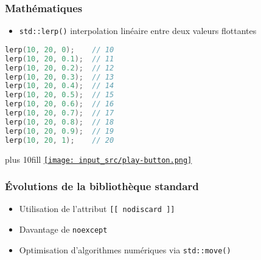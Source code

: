 \documentclass[C++.tex]{subfiles}
\begin{document}
\begin{frame}[fragile]
\frametitle{Mathématiques}
	\begin{itemize}
		\item \lstinline|std::lerp()| interpolation linéaire entre deux valeurs flottantes
	\end{itemize}

	\begin{lstlisting}[language=C++]
lerp(10, 20, 0);    // 10
lerp(10, 20, 0.1);  // 11
lerp(10, 20, 0.2);  // 12
lerp(10, 20, 0.3);  // 13
lerp(10, 20, 0.4);  // 14
lerp(10, 20, 0.5);  // 15
lerp(10, 20, 0.6);  // 16
lerp(10, 20, 0.7);  // 17
lerp(10, 20, 0.8);  // 18
lerp(10, 20, 0.9);  // 19
lerp(10, 20, 1);    // 20\end{lstlisting}

	\vskip 10mm plus 10fill
	\hfill
	\href{https://godbolt.org/#z:OYLghAFBqd5QCxAYwPYBMCmBRdBLAF1QCcAaPECAMzwBtMA7AQwFtMQByARg9KtQYEAysib0QXACx8BBAKoBnTAAUAHpwAMvAFYTStJg1DIApACYAQuYukl9ZATwDKjdAGFUtAK4sGe1wAyeAyYAHI%2BAEaYxBIAHKQADqgKhE4MHt6%2BekkpjgJBIeEsUTFc8XaYDmlCBEzEBBk%2Bfly2mPZ5DDV1BAVhkdF6CrX1jVktQ929RSUSAJS2qF7EyOwc5gDMwcjeWADUJutuTkPEmKwH2CYaAIIbWzuY%2B4fILEwECBdXtzfBBLuvwQgsy%2BJgA7FYbrtdkN0CAUIs/gc3EjoQRYSB6MQEhAuBpSLszHjdhpZk9kYd9mYzCYAKxuBjmanrCHXKEwuFoLyIw4o9kY6LY3H4wn4jQAOi4pKRKMZtPpsuZXzZaI5CLJvJV/KxOKJIuJYrMUp5FNldIZVIOLOV6M53PJblR6Mxgt1RPF6yN9sp1LNCqtjtVXPVFL5zp1wrdYsknplFt9FsVkID8KD0pDmrDQoJkZpMZNcflCf9fNtwYdoYF4ezorFADY8w7TYWmcXNaW0%2BWM5Ws3rxaCG965eaW0rk%2B3jZ2nd3XTXYgOm8PLaOS2qO8nMzP9QBOecFxeJ1lj1cT9fTiP4yVlwfxkc3MEAES%2BHHmtE4NN4fg4WlIqE4yMs1jQosyyPBsPCkAQmjPvMADWIA0nir4cJIH5QT%2BnC8AoIB4pBX7PqQcCwEgmCqJUXIkOQlB1MACjKIYbRCAgqAAO6fuBaAsAkdBvGkdEhLQjEsZ%2B34cVxmIgMAXBUqQol0NEoSsKsvCyZiADyXKCaxaEkZU1zEDRGGkDpyA1Pgn68PwggiGI7BSDIgiKCo6h4aQugtAYRgoNY1j6HgERYbAzBsCAESoMkBCkAAbgM3Cgu%2BszzKgCQdFhHAALQwgc96mABliErsaUAOpiLQBWFSRBDEEwBUJJg6CGI4yCYcBKyDGiwR8QxTFadwvCVZgqzgcxVUJFBL5vqhLm/hw2Ckcg5HELsqixLWaW1pIuzAMgyC7FJBq7BA/5WJY%2BK4IQJCUuskp9WN8wIGcWAxECpBwQh%2BicChpDCbw02YdhEG3e9HBmJN36/QDeEJVF0QpM4khAA%3D%3D}{\texttt{[image: input\_src/play-button.png]}}
\end{frame}

\begin{frame}[fragile]
	\frametitle{Évolutions de la bibliothèque standard}
	\begin{itemize}
		\item Utilisation de l'attribut \lstinline|[[ nodiscard ]]|
		\item Davantage de \lstinline|noexcept|
		\item Optimisation d'algorithmes numériques via \lstinline|std::move()|

	\end{itemize}
\end{frame}
\end{document}
